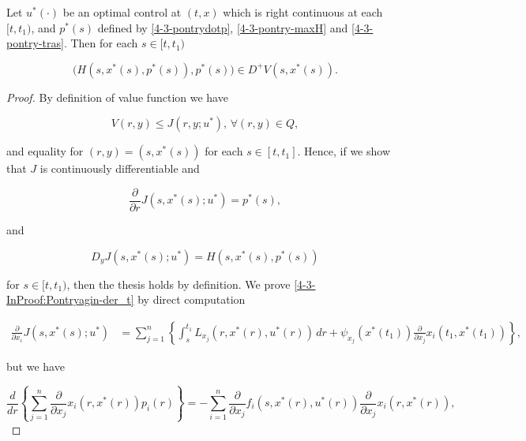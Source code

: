 \begin{theorem}
    Let $u^{\ast}(\cdot)$ be an optimal control at $(t,x)$ which is right continuous at each $[t,t_1)$, and $p^{\ast}(s)$ defined by \ref{4-3-pontrydotp}, \ref{4-3-pontry-maxH} and \ref{4-3-pontry-tras}. 
    Then for each $s\in[t,t_1)$ 
    
    \begin{equation}
        \bigg(H(s,x^{\ast}(s),p^{\ast}(s)),p^{\ast}(s)\bigg) \in D^+V(s,x^{\ast}(s)).
    \end{equation}

    \begin{proof}
        By definition of value function we have

        \[V(r,y) \leq J(r,y;u^{\ast}),\,\forall (r,y)\in Q,\]

        and equality for $(r,y)=(s,x^{\ast}(s))$ for each $s\in[t,t_1]$. Hence, if we show that $J$ is continuously differentiable and

        \begin{equation}\label{4-3-InProof:Pontryagin-der_t}
            \frac{\partial}{\partial r}J(s,x^{\ast}(s);u^{\ast}) = p^{\ast}(s),
        \end{equation}

        and 

        \begin{equation}\label{4-3-InProof:Pontryagin-der_x}
            D_yJ(s,x^{\ast}(s);u^{\ast}) = H(s,x^{\ast}(s),p^{\ast}(s))
        \end{equation}

        for $s\in[t,t_1)$, then the thesis holds by definition. We prove \ref{4-3-InProof:Pontryagin-der_t} by direct computation 

        \begin{align*}
            \frac{\partial}{\partial x_i}J(s,x^{\ast}(s);u^{\ast}) & = \sum_{j=1}^n\left\{\int_s^{t_1} L_{x_j}(r,x^{\ast}(r),u^{\ast}(r))\,dr + \psi_{x_j}(x^{\ast}(t_1))\frac{\partial}{\partial x_j}x_i(t_1,x^{\ast}(t_1))\right\},
        \end{align*}

        but we have
        
        \begin{equation}
            \frac{d}{dr}\left\{\sum_{j=1}^n \frac{\partial}{\partial x_j}x_i(r,x^{\ast}(r))p_i(r) \right\} = - \sum_{i=1}^n \frac{\partial}{\partial x_{j}}f_i(s,x^{\ast}(r),u^{\ast}(r))\frac{\partial}{\partial x_j}x_i(r,x^{\ast}(r)),
        \end{equation}


\end{proof}
\end{theorem}
